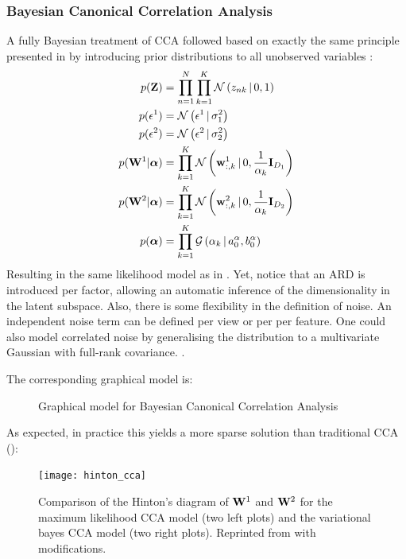 \subsubsection{Bayesian Canonical Correlation Analysis} \label{section:bayesian_cca}

A fully Bayesian treatment of CCA followed based on exactly the same principle presented in  by introducing prior distributions to all unobserved variables \cite{Wang2007,Klami2013}:
\begin{align*} 
	p({\bf Z}) &= \prod_{n=1}^{N} \prod_{k=1}^{K} \mathcal{N}\left(z_{nk} \,|\, 0,1\right) \\
	p(\epsilon^{1}) &= \mathcal{N}\left(\epsilon^{1} \,|\, \sigma_{1}^{2}\right) \\
	p(\epsilon^{2}) &= \mathcal{N}\left(\epsilon^{2} \,|\, \sigma_{2}^{2}\right) \\
	p({\bf W}^1|\mbox{\boldmath $\alpha$}) &= \prod_{k=1}^{K} \mathcal{N}\left({\bf w}^{1}_{:,k} \,|\, 0,\frac{1}{\alpha_{k}}{\bf I}_{D_1}\right) \\
	p({\bf W}^2|\mbox{\boldmath $\alpha$}) &= \prod_{k=1}^{K} \mathcal{N}\left({\bf w}^{2}_{:,k} \,|\, 0,\frac{1}{\alpha_{k}}{\bf I}_{D_2}\right) \\
	p(\mbox{\boldmath $\alpha$}) &= \prod_{k=1}^{K} \mathcal{G}\left(\alpha_k \,|\, a_0^\alpha, b_0^\alpha\right)
\end{align*}
Resulting in the same likelihood model as in . Yet, notice that an ARD is introduced per factor, allowing an automatic inference of the dimensionality in the latent subspace.
Also, there is some flexibility in the definition of noise. An independent noise term can be defined per view or per per feature. One could also model correlated noise by generalising the distribution to a multivariate Gaussian with full-rank covariance. \cite{Wang2007,Klami2013}.

The corresponding graphical model is:

\begin{figure}[H] \begin{center}
	
	\label{fig:graphical_bayesianCCA}
	\caption{Graphical model for Bayesian Canonical Correlation Analysis}
\end{center} \end{figure}

As expected, in practice this yields a more sparse solution than traditional CCA ():

\begin{figure}[H]
	\centering
	\texttt{[image: hinton\_cca]}
	\caption{Comparison of the Hinton's diagram of ${\bf W}^{1}$ and ${\bf W}^{2}$ for the maximum likelihood CCA model (two left plots) and the variational bayes CCA model (two right plots). Reprinted from \cite{Wang2007} with modifications.}
	\label{fig:hinton_cca}
\end{figure}


